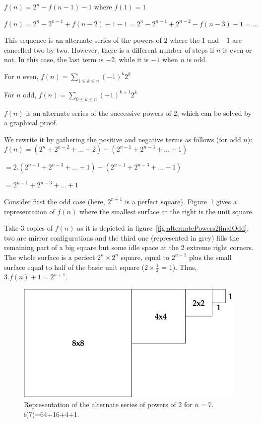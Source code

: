 {$f(n) = 2^{n} - f(n-1) -1$ where $f(1)=1$

$f(n) = 2^{n} - 2^{n-1} + f(n-2) +1 -1 = 2^{n} - 2^{n-1} + 2^{n-2} - f(n-3) -1 = ...$

This sequence is an alternate series of the powers of $2$ where the $1$ and $-1$ are cancelled two by two.
However, there is a different number of steps if $n$ is even or not. 
In this case, the last term is $-2$, while it is $-1$ when $n$ is odd.
\bigskip

For $n$ even, $f(n) = \sum_{1 \leq k \leq n}(-1)^{k}2^{k} $

For $n$ odd, $f(n) = \sum_{0 \leq k \leq n}(-1)^{k+1}2^{k} $
\bigskip

$f(n)$ is an alternate series of the successive powers of $2$, which can be solved by a graphical proof.

We rewrite it by gathering the positive and negative terms as follows (for odd $n$): 
$f(n) = (2^{n} + 2^{n-2} + ... + 2) - (2^{n-1} + 2^{n-3} + ... + 1)$

$= 2.(2^{n-1} + 2^{n-3}  + ...  +1) - (2^{n-1} + 2^{n-3}  + ... + 1)$

$= 2^{n-1} + 2^{n-3}  + ...  +1$ 

Consider first the odd case (here, $2^{n+1}$ is a perfect square).
Figure~\ref{fig:alternatePowers2odd} gives a representation of $f(n)$ 
where the smallest surface at the right is the unit square.

Take 3 copies of $f(n)$ as it is depicted in figure~\ref{fig:alternatePowers2finalOdd},
two are mirror configurations and the third one (represented in grey) fills the remaining part of a big square but some idle space at the 2 extreme right corners. 
The whole surface is a perfect $2^{n} \times 2^{n}$ square, equal to $2^{n+1}$ plus the small surface equal to half of the basic unit square ($2 \times \frac{1}{2}$ = 1). Thus, $3.f(n)+1= 2^{n+1}$.

\begin{figure} [h]
\begin{center}
        \includegraphics[scale=0.4]{FiguresMaths/alternatePowers2initOdd.png}
        \caption{Representation of the alternate series of powers of $2$ for $n=7$.
        f(7)=64+16+4+1.}
        \label{fig:alternatePowers2odd}
\end{center}
\end{figure}

}
